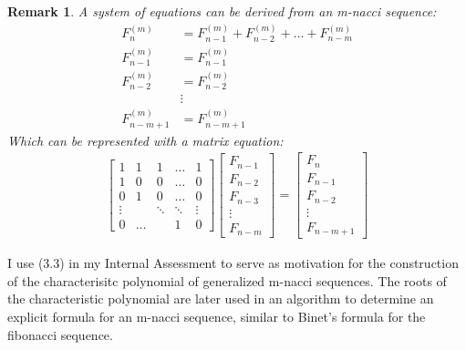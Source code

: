 \documentclass{article}
\newtheorem{remark}[theorem]{Remark}
\begin{document}
\begin{remark}
    A system of equations can be derived from an m-nacci sequence:
    \begin{align*}
        F_n^{(m)} &= F^{(m)}_{n-1}+F^{(m)}_{n-2}+\dots+F^{(m)}_{n-m} \\ 
        F_{n-1}^{(m)} &= F_{n-1}^{(m)} \\ 
        F_{n-2}^{(m)} &= F_{n-2}^{(m)} \\
        &\vdots \\ 
        F_{n-m+1}^{(m)} &= F_{n-m+1}^{(m)}
    \end{align*}
    Which can be represented with a matrix equation:
    \begin{align*}
        \begin{bmatrix} 
            1 & 1 & 1 & \dots & 1 \\
            1 & 0 & 0 & \dots & 0 \\
            0 & 1 & 0 & \dots & 0 \\
            \vdots & & \ddots & \ddots  & \vdots \\ 
            0 & \dots & & 1 & 0
        \end{bmatrix}
        \begin{bmatrix} 
            F_{n-1} \\
            F_{n-2} \\
            F_{n-3} \\
            \vdots \\ 
            F_{n-m}
        \end{bmatrix} = 
        \begin{bmatrix} 
            F_{n} \\
            F_{n-1} \\
            F_{n-2} \\
            \vdots \\ 
            F_{n-m+1}
        \end{bmatrix}
    \end{align*}
\end{remark}

I use (3.3) in my Internal Assessment to serve as motivation for the construction of the characterisitc polynomial of generalized m-nacci sequences. The roots of the characteristic polynomial are later used in an algorithm to determine an explicit formula for an m-nacci sequence, similar to Binet's formula for the fibonacci sequence.
\end{document}

